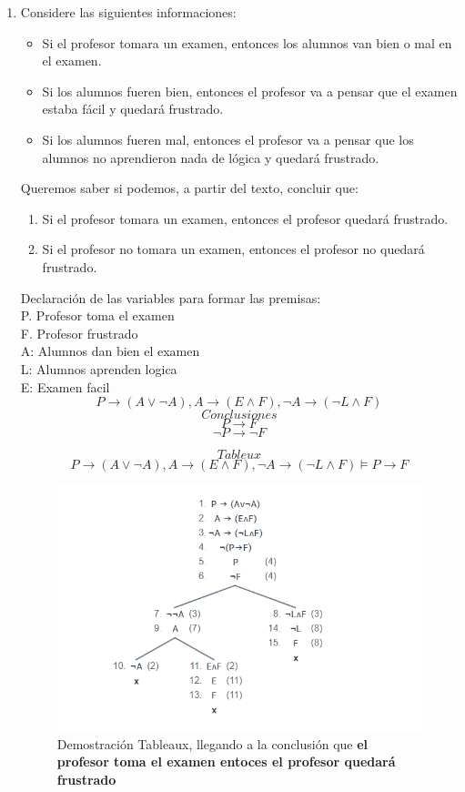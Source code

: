 \documentclass{article}
\begin{document}
\begin{enumerate}
		
		\item Considere las siguientes informaciones:
		\begin{itemize}
		    \item Si el profesor tomara un examen, entonces los alumnos van bien o mal en el examen.
		    \item Si los alumnos fueren bien, entonces el profesor va a pensar que el examen estaba fácil y quedará frustrado.
		    \item Si los alumnos fueren mal, entonces el profesor va a pensar que los alumnos no aprendieron nada de lógica y quedará frustrado.
		\end{itemize}
		Queremos saber si podemos, a partir del texto, concluir que:
		\begin{enumerate}
		    \item Si el profesor tomara un examen, entonces el profesor quedará frustrado.
		    \item Si el profesor no tomara un examen, entonces el profesor no quedará frustrado.
		\end{enumerate}
		
		
		Declaración de las variables para formar las premisas: \\
		
		P. Profesor toma el examen\\
		F. Profesor frustrado\\
		A: Alumnos dan bien el examen\\
		L: Alumnos aprenden logica\\
		E: Examen facil\\
		\[ P \to (A \lor \neg A), A \to (E \land F), \neg A \to (\neg L \land F ) \]
		\[ Conclusiones \]
		\[ P \to F \]
		\[ \neg P \to \neg F \]
		   
                \[ Tableux \]
		        \[ P \to (A \lor \neg A), A \to (E \land F), \neg A \to (\neg L \land F ) \models P \to F \]
		        \begin{figure}[H]
        			\centering
        			\includegraphics[scale=0.80]{img/ejercicio_03.png}
        			\caption{Demostración Tableaux, llegando a la conclusión que \textbf{ el profesor toma el examen entoces el profesor quedará frustrado}}
        			\label{fig:3_1}
        		\end{figure}
            


\end{enumerate}
\end{document}
